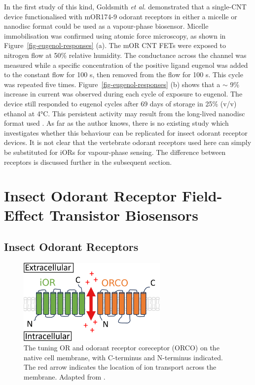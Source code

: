 \documentclass[
  a4paper,
]{scrbook}
\begin{document}
In the first study of this kind, Goldsmith \emph{et al.} demonstrated
that a single-CNT device functionalised with mOR174-9 odorant receptors
in either a micelle or nanodisc format could be used as a vapour-phase
biosensor. Micelle immobilisation was confirmed using atomic force
microscopy, as shown in Figure~\ref{fig-eugenol-responses} (a). The mOR
CNT FETs were exposed to nitrogen flow at 50\% relative humidity. The
conductance across the channel was measured while a specific
concentration of the positive ligand eugenol was added to the constant
flow for 100 s, then removed from the flow for 100 s. This cycle was
repeated five times. Figure~\ref{fig-eugenol-responses} (b) shows that a
\(\sim\) 9\% increase in current was observed during each cycle of
exposure to eugenol. The device still responded to eugenol cycles after
69 days of storage in 25\% (v/v) ethanol at 4°C. This persistent
activity may result from the long-lived nanodisc format used
\autocite{Goldsmith2011}. As far as the author knows, there is no
existing study which investigates whether this behaviour can be
replicated for insect odorant receptor devices. It is not clear that the
vertebrate odorant receptors used here can simply be substituted for
iORs for vapour-phase sensing. The difference between receptors is
discussed further in the subsequent section.

\hypertarget{sec-insect-OR-biosensors}{%
\section{Insect Odorant Receptor Field-Effect Transistor
Biosensors}\label{sec-insect-OR-biosensors}}

\hypertarget{insect-odorant-receptors}{%
\subsection{Insect Odorant Receptors}\label{insect-odorant-receptors}}

\begin{figure}

{\centering \includegraphics[width=0.65\textwidth,height=\textheight]{figures/ch3/OR_diagram.png}

}

\caption{\label{fig-iOR-membrane}The tuning OR and odorant receptor
coreceptor (ORCO) on the native cell membrane, with C-terminus and
N-terminus indicated. The red arrow indicates the location of ion
transport across the membrane. Adapted from
\autocite{Brito2016,Wicher2021}.}

\end{figure}
\end{document}
